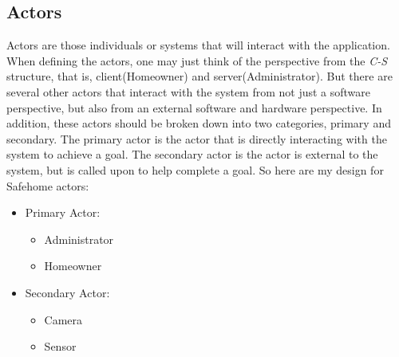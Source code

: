 \documentclass[twoside,11pt]{article}
\begin{document}
\subsection{Actors}

Actors are those individuals or systems that will interact with the application\cite{Lance2018Creating}. When defining the actors, one may just think of the perspective from the \emph{C-S} structure, that is, client(Homeowner) and server(Administrator). But there are several other actors that interact with the system from not just a software perspective, but also from an external software and hardware perspective. In addition, these actors should be broken down into two categories, primary and secondary. The primary actor is the actor that is directly interacting with the system to achieve a goal. The secondary actor is the actor is external to the system, but is called upon to help complete a goal. So here are my design for Safehome actors:
\begin{itemize}
    \item Primary Actor:
          \begin{itemize}
              \item Administrator
              \item Homeowner
          \end{itemize}

    \item Secondary Actor:
          \begin{itemize}
              \item Camera
              \item Sensor
          \end{itemize}
\end{itemize}
\end{document}
